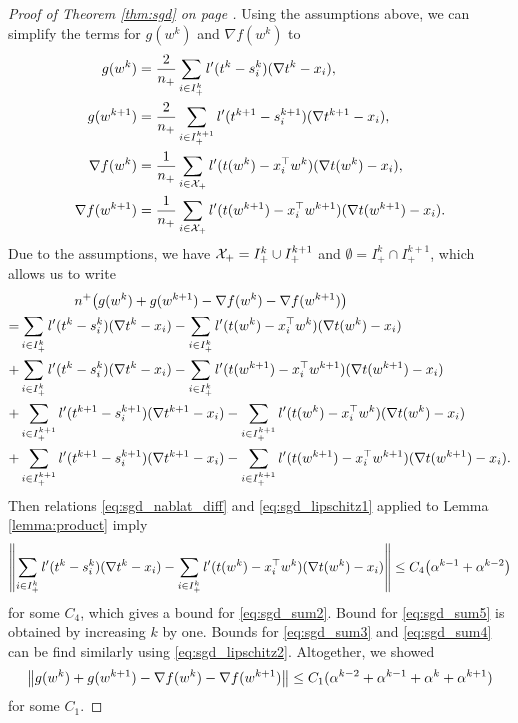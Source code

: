 \begin{proof}[Proof of Theorem \ref{thm:sgd} on page \pageref{thm:sgd}]
  Using the assumptions above, we can simplify the terms for $g(w^k)$ and $\nabla f(w^k)$ to
  \begin{equation*}
    \begin{aligned}
      g(w^k)
      & = \frac{2}{n_+}\sum_{i\in I_+^k}l'(t^k-s_i^k)(\nabla t^k - x_i), \\
      g(w^{k+1})
      & = \frac{2}{n_+}\sum_{i\in I_+^{k+1}}l'(t^{k+1}-s_i^{k+1})(\nabla t^{k+1} - x_i), \\
      \nabla f(w^k)
      & = \frac{1}{n_+}\sum_{i \in \mathcal{X}_+}l'(t(w^k)-x_i^\top w^k)(\nabla t(w^k) - x_i), \\
      \nabla f(w^{k+1})
      & = \frac{1}{n_+}\sum_{i \in \mathcal{X}_+}l'(t(w^{k+1})-x_i^\top w^{k+1})(\nabla t(w^{k+1}) - x_i).
    \end{aligned}
  \end{equation*}
  Due to the assumptions, we have $\mathcal{X}_+=I_+^k\cup I_+^{k+1}$ and $\emptyset=I_+^k\cap I_+^{k+1}$, which allows us to write
  \begin{subequations}\label{eq:sgd_sum}
    \begin{align}
    \label{eq:sgd_sum1}
    & \qquad\qquad n^+\Brac{g(w^k)+g(w^{k+1})-\nabla f(w^k)-\nabla f(w^{k+1})}\\
    \label{eq:sgd_sum2}
    = & \sum_{i\in I_+^k}l'(t^k-s_i^k)(\nabla t^k - x_i) - \sum_{i\in I_+^k}l'(t(w^k)-x_i^\top w^k)(\nabla t(w^k) - x_i) \\
    \label{eq:sgd_sum3}
    + &\sum_{i\in I_+^k}l'(t^k-s_i^k)(\nabla t^k - x_i) - \sum_{i\in I_+^k}l'(t(w^{k+1})-x_i^\top w^{k+1})(\nabla t(w^{k+1}) - x_i)\\
    \label{eq:sgd_sum4}
    + &\sum_{i\in I_+^{k+1}}l'(t^{k+1}-s_i^{k+1})(\nabla t^{k+1} - x_i) - \sum_{i\in I^{k+1}_+}l'(t(w^k)-x_i^\top w^k)(\nabla t(w^k) - x_i) \\
    \label{eq:sgd_sum5}
    + &\sum_{i\in I_+^{k+1}}l'(t^{k+1}-s_i^{k+1})(\nabla t^{k+1} - x_i)  - \sum_{i\in I_+^{k+1}}l'(t(w^{k+1})-x_i^\top w^{k+1})(\nabla t(w^{k+1}) - x_i).
    \end{align}
  \end{subequations}
  Then relations \eqref{eq:sgd_nablat_diff} and \eqref{eq:sgd_lipschitz1} applied to Lemma \ref{lemma:product} imply
  \begin{equation*}
    \nrm{\sum_{i\in I_+^k}l'(t^k-s_i^k)(\nabla t^k - x_i) - \sum_{i\in I_+^k}l'(t(w^k)-x_i^\top w^k)(\nabla t(w^k) - x_i)} \le C_4\Brac{\alpha^{k-1} + \alpha^{k-2}}
  \end{equation*}
  for some $C_4$, which gives a bound for \eqref{eq:sgd_sum2}. Bound for \eqref{eq:sgd_sum5} is obtained by increasing $k$ by one. Bounds for \eqref{eq:sgd_sum3} and \eqref{eq:sgd_sum4} can be find similarly using \eqref{eq:sgd_lipschitz2}. Altogether, we showed
  \begin{equation}\label{eq:nec_cond3}
  \norm{g(w^k)+g(w^{k+1})-\nabla f(w^k)-\nabla f(w^{k+1})} \le C_1(\alpha^{k-2} + \alpha^{k-1} + \alpha^{k} + \alpha^{k+1})
  \end{equation}
  for some $C_1$.


\end{proof}
